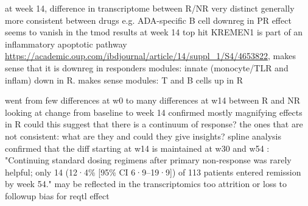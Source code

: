 \begin{outline}
\1 at week 14, difference in transcriptome between R/NR very distinct
    \2 generally more consistent between drugs
        \3 e.g. ADA-specific B cell downreg in PR effect seems to vanish in the tmod results at week 14
    \2 top hit KREMEN1 is part of an inflammatory apoptotic pathway \url{https://academic.oup.com/ibdjournal/article/14/suppl_1/S4/4653822}, makes sense that it is downreg in responders
    \2 modules: innate (monocyte/TLR and inflam) down in R. makes sense
    \2 modules: T and B cells up in R 


\1 went from few differences at w0 to many differences at w14 between R and NR
    \2 looking at change from baseline to week 14 confirmed mostly magnifying effects in R
        \3 could this suggest that there is a continuum of response?
    \2 the ones that are not consistent: what are they and could they give insights?
    \2 spline analysis confirmed that the diff starting at w14 is maintained at w30 and w54
    \2 \autocite{kennedy2019PredictorsAntiTNFTreatment}: "Continuing standard dosing regimens after primary non-response was rarely helpful; only 14 (12·4\% [95\% CI 6·9–19·9]) of 113 patients entered remission by week 54."
        \3 may be reflected in the transcriptomics too
    \2 attrition or loss to followup bias for reqtl effect




\end{outline}
